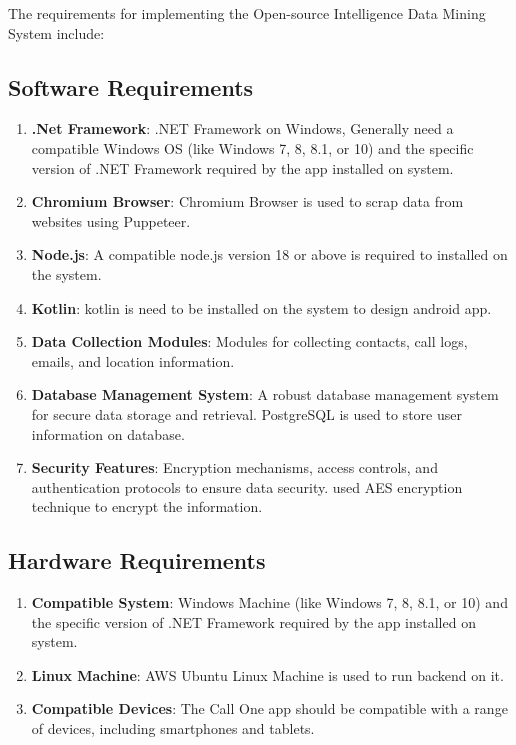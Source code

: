 The requirements for implementing the Open-source Intelligence Data Mining System include:

\subsection{Software Requirements}\label{subsec:software-requirements}

\begin{enumerate}[label=\roman*.]
    \item \textbf{.Net Framework}:  .NET Framework on Windows, Generally need a compatible Windows OS (like Windows 7, 8, 8.1, or 10) and the specific version of .NET Framework required by the app installed on system.
    \item \textbf{Chromium Browser}:  Chromium Browser is used to scrap data from websites using Puppeteer.
    \item \textbf{Node.js}: A compatible node.js version 18 or above is required to installed on the system.
    \item \textbf{Kotlin}: kotlin is need to be installed on the system to design android app.
    \item \textbf{Data Collection Modules}: Modules for collecting contacts, call logs, emails, and location information.
    \item \textbf{Database Management System}: A robust database management system for secure data storage and retrieval.
    PostgreSQL is used to store user information on database.
    \item \textbf{Security Features}: Encryption mechanisms, access controls, and authentication protocols to ensure data security.
    used AES encryption technique to encrypt the information.
\end{enumerate}

\subsection{Hardware Requirements}\label{subsec:hardware-requirements}

\begin{enumerate}[label=\roman*.]
    \item \textbf{Compatible System}: Windows Machine (like Windows 7, 8, 8.1, or 10) and the specific version of .NET Framework required by the app installed on system. 
    \item \textbf{Linux Machine}: AWS Ubuntu Linux Machine is used to run backend on it.
    \item \textbf{Compatible Devices}: The Call One app should be compatible with a range of devices, including smartphones and tablets.
\end{enumerate}